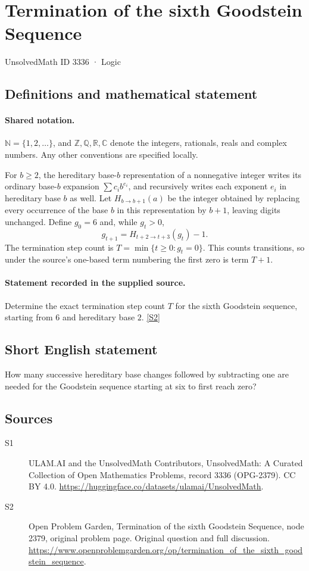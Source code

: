 \documentclass[11pt]{article}
\newcommand{\sref}[2]{\hyperlink{source:#1:#2}{[S#2]}}
\begin{document}
\setcounter{section}{3335}
\section{Termination of the sixth Goodstein Sequence}\label{3336}
{\small\sffamily UnsolvedMath ID 3336 · Logic}
\subsection{Definitions and mathematical statement}

\paragraph{Shared notation.}$\mathbb N=\{1,2,\ldots\}$, and $\mathbb Z,\mathbb Q,\mathbb R,\mathbb C$ denote the integers, rationals, reals and complex numbers. Any other conventions are specified locally.


For $b\geq2$, the hereditary base-$b$ representation of a nonnegative integer writes its ordinary base-$b$ expansion $\sum c_i b^{e_i}$, and recursively writes each exponent $e_i$ in hereditary base $b$ as well. Let $H_{b\to b+1}(a)$ be the integer obtained by replacing every occurrence of the base $b$ in this representation by $b+1$, leaving digits unchanged. Define $g_0=6$ and, while $g_t>0$,\[ g_{t+1}=H_{t+2\to t+3}(g_t)-1. \] The termination step count is $T=\min\{t\geq0:g_t=0\}$. This counts transitions, so under the source's one-based term numbering the first zero is term $T+1$.
\paragraph{Statement recorded in the supplied source.}
Determine the exact termination step count $T$ for the sixth Goodstein sequence, starting from $6$ and hereditary base $2$. \sref{3336}{2}
\subsection{Short English statement}
How many successive hereditary base changes followed by subtracting one are needed for the Goodstein sequence starting at six to first reach zero?
\subsection{Sources}
\begin{description}
\item[\hypertarget{source:3336:1}{S1}] ULAM.AI and the UnsolvedMath Contributors, UnsolvedMath: A Curated Collection of Open Mathematics Problems, record 3336 (OPG-2379). CC BY 4.0. \url{https://huggingface.co/datasets/ulamai/UnsolvedMath}.
\item[\hypertarget{source:3336:2}{S2}] Open Problem Garden, Termination of the sixth Goodstein Sequence, node 2379, original problem page. Original question and full discussion. \url{https://www.openproblemgarden.org/op/termination_of_the_sixth_goodstein_sequence}.

\end{description}
\label{end:3336}
\end{document}
